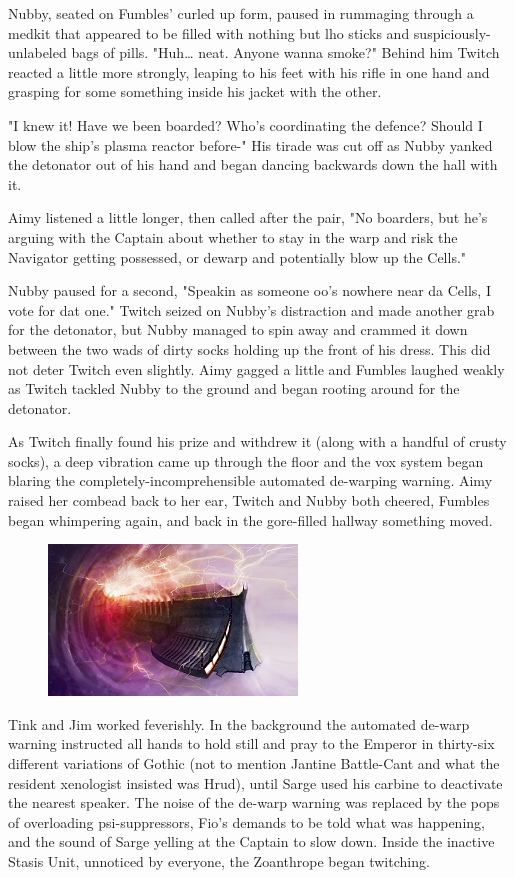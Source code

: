 Nubby, seated on Fumbles' curled up form, paused in rummaging through a medkit that appeared to be filled with nothing but lho sticks and suspiciously-unlabeled bags of pills. 
"Huh… neat. 
Anyone wanna smoke?" Behind him Twitch reacted a little more strongly, leaping to his feet with his rifle in one hand and grasping for some something inside his jacket with the other. 


"I knew it! 
Have we been boarded? 
Who's coordinating the defence? 
Should I blow the ship's plasma reactor before-" His tirade was cut off as Nubby yanked the detonator out of his hand and began dancing backwards down the hall with it.

Aimy listened a little longer, then called after the pair, "No boarders, but he's arguing with the Captain about whether to stay in the warp and risk the Navigator getting possessed, or dewarp and potentially blow up the Cells."

Nubby paused for a second, "Speakin as someone oo's nowhere near da Cells, I vote for dat one." Twitch seized on Nubby's distraction and made another grab for the detonator, but Nubby managed to spin away and crammed it down between the two wads of dirty socks holding up the front of his dress. 
This did not deter Twitch even slightly. 
Aimy gagged a little and Fumbles laughed weakly as Twitch tackled Nubby to the ground and began rooting around for the detonator.

As Twitch finally found his prize and withdrew it (along with a handful of crusty socks), a deep vibration came up through the floor and the vox system began blaring the completely-incomprehensible automated de-warping warning. 
Aimy raised her combead back to her ear, Twitch and Nubby both cheered, Fumbles began whimpering again, and back in the gore-filled hallway something moved.

\begin{figure}
	\begin{center}
		\includegraphics[width=\figwidth]{pics/13/13.png}
	\end{center}
\end{figure}
Tink and Jim worked feverishly. 
In the background the automated de-warp warning instructed all hands to hold still and pray to the Emperor in thirty-six different variations of Gothic (not to mention Jantine Battle-Cant and what the resident xenologist insisted was Hrud), until Sarge used his carbine to deactivate the nearest speaker. 
The noise of the de-warp warning was replaced by the pops of overloading psi-suppressors, Fio's demands to be told what was happening, and the sound of Sarge yelling at the Captain to slow down. 
Inside the inactive Stasis Unit, unnoticed by everyone, the Zoanthrope began twitching.

